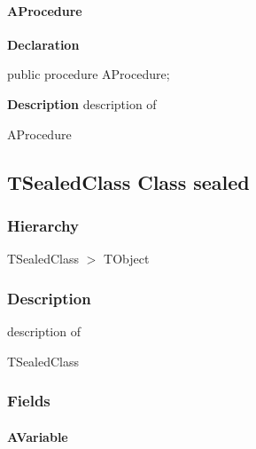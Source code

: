 \documentclass{report}
\begin{document}
\paragraph*{AProcedure}\hspace*{\fill}

\begin{list}{}{
\setlength{\itemindent}{0cm}
\setlength{\listparindent}{0cm}
\setlength{\leftmargin}{\evensidemargin}
\addtolength{\leftmargin}{\tmplength}
\settowidth{\labelsep}{X}
\addtolength{\leftmargin}{\labelsep}
\setlength{\labelwidth}{\tmplength}
}
\begin{flushleft}
\item[\textbf{Declaration}\hfill]
\begin{ttfamily}
public procedure AProcedure;\end{ttfamily}


\end{flushleft}
\par
\item[\textbf{Description}]
description of \begin{ttfamily}AProcedure\end{ttfamily}

\end{list}
\subsection*{TSealedClass Class sealed}
\subsubsection*{\large{\textbf{Hierarchy}}\normalsize\hspace{1ex}\hfill}
TSealedClass {$>$} TObject
\subsubsection*{\large{\textbf{Description}}\normalsize\hspace{1ex}\hfill}
description of \begin{ttfamily}TSealedClass\end{ttfamily}\subsubsection*{\large{\textbf{Fields}}\normalsize\hspace{1ex}\hfill}
\paragraph*{AVariable}\hspace*{\fill}
\end{document}
